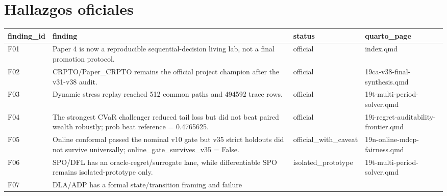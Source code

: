 \documentclass[
  spanish,
  11pt,
  letterpaper,
]{scrbook}
\newcounter{none} %
\theoremstyle{plain}
\theoremstyle{remark}
\begin{document}
\section{Hallazgos oficiales}\label{hallazgos-oficiales}

{\def\LTcaptype{none} %
\begin{longtable}[]{@{}
  >{\raggedright\arraybackslash}p{}
  >{\raggedright\arraybackslash}p{}
  >{\raggedright\arraybackslash}p{}
  >{\raggedright\arraybackslash}p{}@{}}
\toprule\noalign{}
\begin{minipage}[b]{\linewidth}\raggedright
finding\_id
\end{minipage} & \begin{minipage}[b]{\linewidth}\raggedright
finding
\end{minipage} & \begin{minipage}[b]{\linewidth}\raggedright
status
\end{minipage} & \begin{minipage}[b]{\linewidth}\raggedright
quarto\_page
\end{minipage} \\
\midrule\noalign{}
\endhead
\bottomrule\noalign{}
\endlastfoot
F01 & Paper 4 is now a reproducible sequential-decision living lab, not
a final promotion protocol. & official & index.qmd \\
F02 & CRPTO/Paper\_CRPTO remains the official project champion after the
v31-v38 audit. & official & 19ca-v38-final-synthesis.qmd \\
F03 & Dynamic stress replay reached 512 common paths and 494592 trace
rows. & official & 19t-multi-period-solver.qmd \\
F04 & The strongest CVaR challenger reduced tail loss but did not beat
paired wealth robustly; prob beat reference = 0.4765625. & official &
19i-regret-auditability-frontier.qmd \\
F05 & Online conformal passed the nominal v10 gate but v35 strict
holdouts did not survive universally; online\_gate\_survives\_v35 =
False. & official\_with\_caveat & 19n-online-mdcp-fairness.qmd \\
F06 & SPO/DFL has an oracle-regret/surrogate lane, while differentiable
SPO remains isolated-prototype only. & isolated\_prototype &
19t-multi-period-solver.qmd \\
F07 & DLA/ADP has a formal state/transition framing and failure

\end{longtable}}
\end{document}

